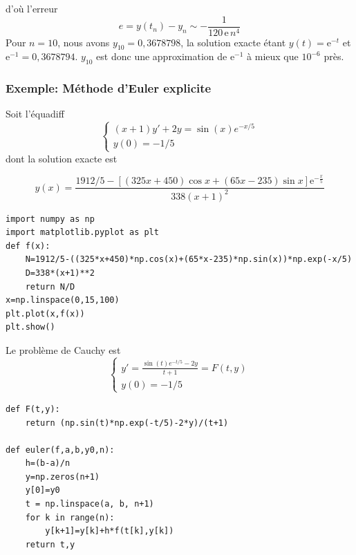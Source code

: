 \documentclass{beamer}
\begin{document}
\begin{frame}
d'où l'erreur 
\[e=y(t_n)-y_n\sim -\frac 1{120 \,\mbox{e}\, n^4}\]
Pour $n=10$, nous avons $y_{10}=0,3678798$, la solution exacte étant $y(t)=\mbox{e}^{-t}$ et  $\mbox{e}^{-1}= 0,3678794$. $y_{10}$ est donc une approximation de $\mbox{e}^{-1}$ à mieux que $10^{-6}$ près.
\end{frame}




\begin{frame}[fragile]
 \frametitle{Exemple: Méthode d'Euler explicite}
Soit l'équadiff
\[\left\{\begin{array}{l}
(x+1)y'+2y=\sin(x) e^{-x/5} \\
y(0)=-1/5
\end{array}\right.
\]
dont la solution exacte est

\[y(x)=\frac{1912/5-\left[(325x+450)\cos x+(65x-235)\sin x\right]{\mathrm e}^{-\frac{x}{5}}}{338(x+1)^2}\]
\begin{verbatim}
import numpy as np
import matplotlib.pyplot as plt
def f(x):
    N=1912/5-((325*x+450)*np.cos(x)+(65*x-235)*np.sin(x))*np.exp(-x/5)
    D=338*(x+1)**2
    return N/D
x=np.linspace(0,15,100)
plt.plot(x,f(x))
plt.show()
\end{verbatim}
\end{frame}



\begin{frame}[fragile]
Le problème de Cauchy est
\[\left\{\begin{array}{l}
y'=\frac{\sin(t) e^{-t/5} -2y}{t+1} =F(t,y) \\
y(0)=-1/5
\end{array}\right.
\]
\begin{verbatim}
def F(t,y):
    return (np.sin(t)*np.exp(-t/5)-2*y)/(t+1)

def euler(f,a,b,y0,n):
    h=(b-a)/n
    y=np.zeros(n+1)
    y[0]=y0
    t = np.linspace(a, b, n+1)
    for k in range(n):
        y[k+1]=y[k]+h*f(t[k],y[k])
    return t,y
\end{verbatim}

\end{frame}
  
\end{document}
